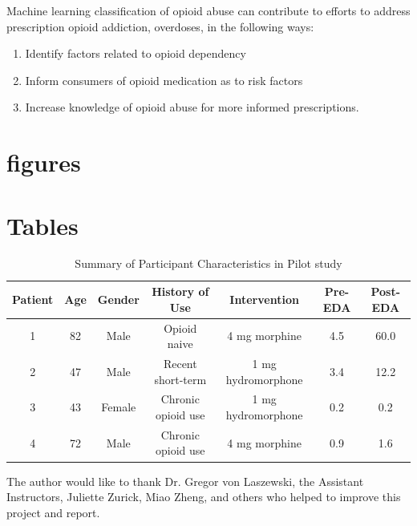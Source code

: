 \documentclass[sigconf]{acmart}
\begin{document}
Machine learning classification of opioid abuse can contribute to efforts to address prescription opioid addiction, overdoses, in the following ways: 
\begin{enumerate}
\item Identify factors related to opioid dependency
\item Inform consumers of opioid medication as to risk factors 
\item Increase knowledge of opioid abuse for more informed prescriptions. 
\end{enumerate}



\section{figures}




\section{Tables}


\begin{table}
  \caption{Summary of Participant Characteristics in Pilot study \cite{carreiro15}}
  \label{tab:freq}
  \begin{tabular}{ccccccc}
    \toprule
     Patient& Age& Gender& History of Use& Intervention& Pre-EDA& Post-EDA \\
    \midrule
    1& 82& Male& Opioid naive& 4 mg morphine& 4.5& 60.0 \\
    2& 47& Male& Recent short-term& 1 mg hydromorphone& 3.4& 12.2 \\
    3& 43& Female& Chronic opioid use& 1 mg hydromorphone& 0.2& 0.2 \\
    4& 72& Male& Chronic opioid use& 4 mg morphine& 0.9& 1.6 \\
    \bottomrule
  \end{tabular}
\end{table}


\begin{acks}

  The author would like to thank Dr. Gregor von Laszewski, 
  the Assistant Instructors, Juliette Zurick, Miao Zheng,
  and others who helped to improve this project and report.

\end{acks}
\end{document}
